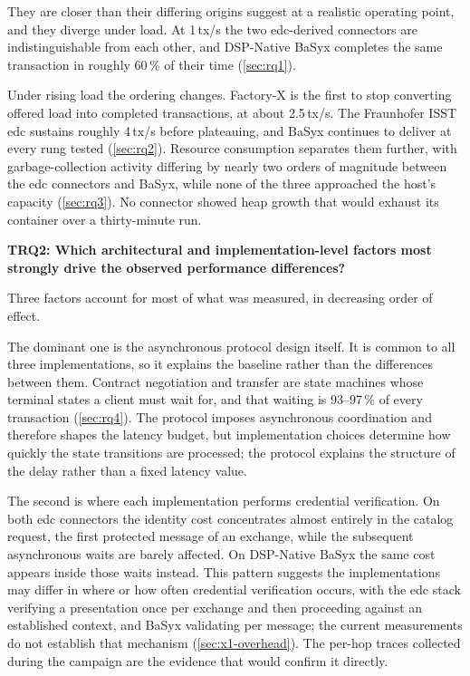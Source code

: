 They are closer than their differing origins suggest at a realistic operating point, and
they diverge under load. At 1\,tx/s the two \gls{edc}-derived connectors are
indistinguishable from each other, and DSP-Native BaSyx completes the same transaction in roughly 60\,\% of their time (\cref{sec:rq1}).

Under rising load the ordering changes. Factory-X is the first to stop converting offered load into completed transactions, at about 2.5\,tx/s. The Fraunhofer ISST \gls{edc} sustains roughly 4\,tx/s before plateauing, and BaSyx continues to deliver at every rung tested (\cref{sec:rq2}). Resource consumption
separates them further, with garbage-collection activity differing by nearly two orders of
magnitude between the \gls{edc} connectors and BaSyx, while none of the three approached
the host's capacity (\cref{sec:rq3}). No connector showed heap growth that would exhaust
its container over a thirty-minute run.

\textbf{TRQ2: Which architectural and implementation-level factors most strongly drive
the observed performance differences?}

Three factors account for most of what was measured, in decreasing order of effect.

The dominant one is the asynchronous protocol design itself. It is common to all
three implementations, so it explains the baseline rather than the differences between
them. Contract negotiation and transfer are state machines whose terminal states a client
must wait for, and that waiting is 93--97\,\% of every transaction (\cref{sec:rq4}). The protocol imposes asynchronous coordination and
therefore shapes the latency budget, but implementation choices determine how quickly the
state transitions are processed; the protocol explains the structure of the delay rather than
a fixed latency value.

The second is where each implementation performs credential verification. On both
\gls{edc} connectors the identity cost concentrates almost entirely in the catalog request, the first protected message of an exchange, while the subsequent asynchronous waits
are barely affected. On DSP-Native BaSyx the same cost appears inside those waits instead.
This pattern suggests the implementations may differ in where or how often credential verification occurs, with the \gls{edc} stack verifying a presentation once per exchange and then proceeding against an established context, and BaSyx validating per message; the current measurements do not establish that mechanism (\cref{sec:x1-overhead}). The per-hop traces collected during the campaign are the evidence that would confirm it directly.

